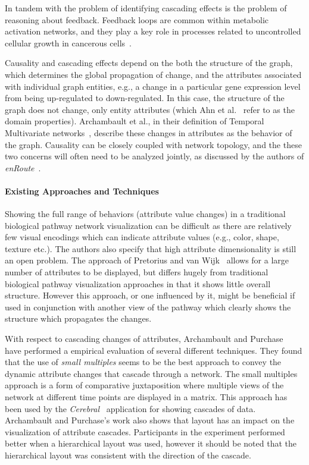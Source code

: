\documentclass[twocolumn]{bmcart}%
\begin{document}
In tandem with the problem of identifying cascading effects is the problem of reasoning about feedback.
Feedback loops are common within metabolic activation networks, and they play a key role in processes related to uncontrolled cellular growth in cancerous cells~\cite{cairns2011regulation}.

Causality and cascading effects depend on the both the structure of the graph, which determines the global propagation of change, and the attributes associated with individual graph entities, e.g., a change in a particular gene expression level from being up-regulated to down-regulated.
In this case, the structure of the graph does not change, only entity attributes (which Ahn et al.~\cite{Ahn2014} refer to as the domain properties).
Archambault et al., in their definition of Temporal Multivariate networks~\cite{archambault2014temporal}, describe these changes in attributes as the behavior of the graph.
Causality can be closely coupled with network topology, and the these two concerns will often need to be analyzed jointly, as discussed by the authors of \textit{enRoute}~\cite{Partl2012enroute}.

\paragraph*{Existing Approaches and Techniques}

Showing the full range of behaviors (attribute value changes) in a traditional biological pathway network visualization can be difficult as there are relatively few visual encodings which can indicate attribute values (e.g., color, shape, texture etc.).
The authors also specify that high attribute dimensionality is still an open problem.
The approach of Pretorius and van Wijk~\cite{pretorius2008} allows for a large number of attributes to be displayed, but differs hugely from traditional biological pathway visualization approaches in that it shows little overall structure.
However this approach, or one influenced by it, might be beneficial if used in conjunction with another view of the pathway which clearly shows the structure which propagates the changes.

With respect to cascading changes of attributes, Archambault and Purchase~\cite{Archambault2016} have performed a empirical evaluation of several different techniques.
They found that the use of \emph{small multiples} seems to be the best approach to convey the dynamic attribute changes that cascade through a network.
The small multiples approach is a form of comparative juxtaposition where multiple views of the network at different time points are displayed in a matrix.
This approach has been used by the \textit{Cerebral}~\cite{Barsky2008cerebral} application for showing cascades of data.
Archambault and Purchase's work also shows that layout has an impact on the visualization of attribute cascades.
Participants in the experiment performed better when a hierarchical layout was used, however it should be noted that the hierarchical layout was consistent with the direction of the cascade.
\end{document}
